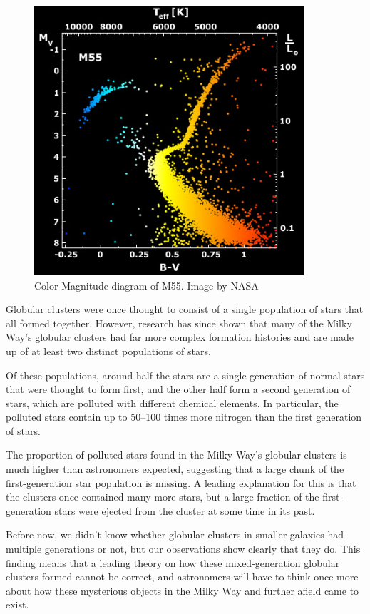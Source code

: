 \begin{figure}[H]
\centering
\includegraphics[width=10cm]{images/m55_diagram.jpg}
\caption[Color Magnitude diagram of M55]{Color Magnitude diagram of M55. Image by NASA}
\end{figure}

Globular clusters were once thought to consist of a single population of stars that all formed together. However, research has since shown that many of the Milky Way's globular clusters had far more complex formation histories and are made up of at least two distinct populations of stars.
 
Of these populations, around half the stars are a single generation of normal stars that were thought to form first, and the other half form a second generation of stars, which are polluted with different chemical elements. In particular, the polluted stars contain up to 50–100 times more nitrogen than the first generation of stars.

The proportion of polluted stars found in the Milky Way's globular clusters is much higher than astronomers expected, suggesting that a large chunk of the first-generation star population is missing. A leading explanation for this is that the clusters once contained many more stars, but a large fraction of the first-generation stars were ejected from the cluster at some time in its past.

Before now, we didn't know whether globular clusters in smaller galaxies had multiple generations or not, but our observations show clearly that they do. This finding means that a leading theory on how these mixed-generation globular clusters formed cannot be correct, and astronomers will have to think once more about how these mysterious objects in the Milky Way and further afield came to exist.

